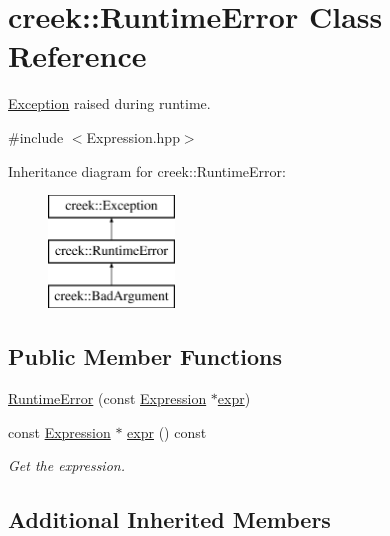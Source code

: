 \hypertarget{classcreek_1_1_runtime_error}{}\section{creek\+:\+:Runtime\+Error Class Reference}
\label{classcreek_1_1_runtime_error}


\hyperlink{classcreek_1_1_exception}{Exception} raised during runtime.  




{\ttfamily \#include $<$Expression.\+hpp$>$}

Inheritance diagram for creek\+:\+:Runtime\+Error\+:\begin{figure}[H]
\begin{center}
\leavevmode
\includegraphics[height=3.000000cm]{classcreek_1_1_runtime_error}
\end{center}
\end{figure}
\subsection*{Public Member Functions}
\begin{DoxyCompactItemize}
\item 
\hyperlink{classcreek_1_1_runtime_error_a166c8917f20e37ffec3f6523e998d295}{Runtime\+Error} (const \hyperlink{classcreek_1_1_expression}{Expression} $\ast$\hyperlink{classcreek_1_1_runtime_error_a30ca1c364ada5b9a9fb37d1bc831db89}{expr})
\item 
const \hyperlink{classcreek_1_1_expression}{Expression} $\ast$ \hyperlink{classcreek_1_1_runtime_error_a30ca1c364ada5b9a9fb37d1bc831db89}{expr} () const \hypertarget{classcreek_1_1_runtime_error_a30ca1c364ada5b9a9fb37d1bc831db89}{}\label{classcreek_1_1_runtime_error_a30ca1c364ada5b9a9fb37d1bc831db89}

\begin{DoxyCompactList}\small\item\em Get the expression. \end{DoxyCompactList}\end{DoxyCompactItemize}
\subsection*{Additional Inherited Members}


